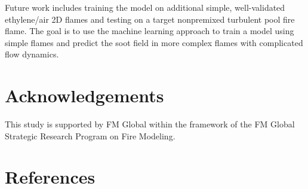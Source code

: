 \documentclass[12pt]{CHT-20}
\begin{document}
Future work includes training the model on additional simple, well-validated ethylene/air 2D flames and testing on a target nonpremixed turbulent pool fire flame. The goal is to use the machine learning approach to train a model using simple flames and predict the soot field in more complex flames with complicated flow dynamics.




\section{Acknowledgements} \label{sec:acknowledgements}

This study is supported by FM Global within the framework of the FM Global Strategic Research Program on Fire Modeling.


\section{References} \label{sec:references}


 
\end{document}

